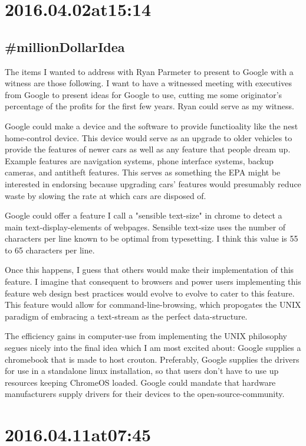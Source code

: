 \section*{ 2016.04.02at15:14 }
\subsection*{\#millionDollarIdea}
The items I wanted to address with Ryan Parmeter to present to Google with a witness are those following. I want to have a witnessed meeting with executives from Google to present ideas for Google to use, cutting me some originator's percentage of the profits for the first few years. Ryan could serve as my witness.

Google could make a device and the software to provide functioality like the nest home-control device. This device would serve as an upgrade to older vehicles to provide the features of newer cars as well as any feature that people dream up. Example features are navigation systems, phone interface systems, backup cameras, and antitheft features. This serves as something the EPA might be interested in endorsing because upgrading cars' features would presumably reduce waste by slowing the rate at which cars are disposed of.

Google could offer a feature I call a "sensible text-size" in chrome to detect a main text-display-elements of webpages. Sensible text-size uses the number of characters per line known to be optimal from typesetting. I think this value is 55 to 65 characters per line.

Once this happens, I guess that others would make their implementation of this feature. I imagine that consequent to browsers and power users implementing this feature web design best practices would evolve to evolve to cater to this feature. This feature would allow for command-line-browsing, which propogates the UNIX paradigm of embracing a text-stream as the perfect data-structure.

The efficiency gains in computer-use from implementing the UNIX philosophy segues nicely into the final idea which I am most excited about: Google supplies a chromebook that is made to host crouton. Preferably, Google supplies the drivers for use in a standalone linux installation, so that users don't have to use up resources keeping ChromeOS loaded. Google could mandate that hardware manufacturers supply drivers for their devices to the open-source-community. 

\section*{ 2016.04.11at07:45 }
